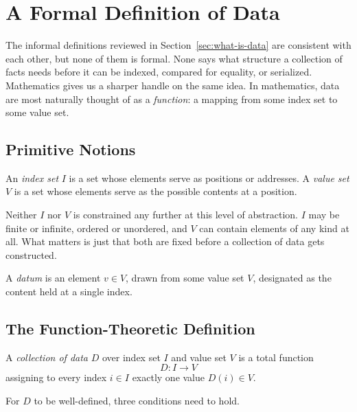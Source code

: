 \newpage
\section{A Formal Definition of Data}
\label{sec:formal-definition}

The informal definitions reviewed in Section~\ref{sec:what-is-data} are
consistent with each other, but none of them is formal. None says what
structure a collection of facts needs before it can be indexed, compared for
equality, or serialized. Mathematics gives us a sharper handle on the same
idea. In mathematics, data are most naturally thought of as a
\emph{function}: a mapping from some index set to some value set.

\subsection{Primitive Notions}

\begin{definition}
\label{def:index-value}
An \emph{index set} $I$ is a set whose elements serve as positions or
addresses. A \emph{value set} $V$ is a set whose elements serve as the
possible contents at a position.
\end{definition}

Neither $I$ nor $V$ is constrained any further at this level of abstraction.
$I$ may be finite or infinite, ordered or unordered, and $V$ can contain
elements of any kind at all. What matters is just that both are fixed before a
collection of data gets constructed.

\begin{definition}[Datum]
\label{def:datum}
A \emph{datum} is an element $v \in V$, drawn from some value set $V$,
designated as the content held at a single index.
\end{definition}

\subsection{The Function-Theoretic Definition}

\begin{definition}
\label{def:collection}
A \emph{collection of data} $D$ over index set $I$ and value set $V$ is a
total function
\[
  D : I \to V
\]
assigning to every index $i \in I$ exactly one value $D(i) \in V$.
\end{definition}

For $D$ to be well-defined, three conditions need to hold.

